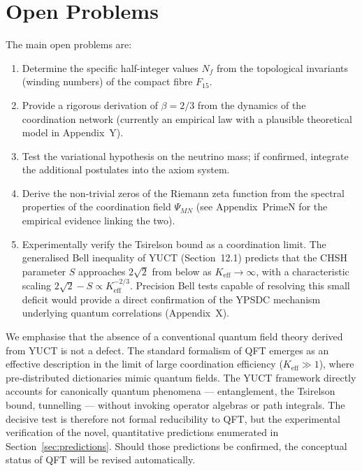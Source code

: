\documentclass[12pt,a4paper]{article}
\theoremstyle{remark}
\begin{document}
	\section{Open Problems}
	\label{sec:open}
	
	The main open problems are:
	
	\begin{enumerate}[label=(\roman*)]
		\item Determine the specific half-integer values \(N_f\) from the topological
		invariants (winding numbers) of the compact fibre \(F_{15}\).
		\item Provide a rigorous derivation of \(\beta = 2/3\) from the dynamics of
		the coordination network (currently an empirical law with a plausible
		theoretical model in Appendix~Y).
		\item Test the variational hypothesis on the neutrino mass; if confirmed,
		integrate the additional postulates into the axiom system.
		\item Derive the non-trivial zeros of the Riemann zeta function from the
		spectral properties of the coordination field \(\Psi_{MN}\) (see
		Appendix~PrimeN for the empirical evidence linking the two).
		\item Experimentally verify the Tsirelson bound as a coordination limit.
		The generalised Bell inequality of YUCT (Section~12.1) predicts that the
		CHSH parameter \(S\) approaches \(2\sqrt{2}\) from below as
		\(K_{\mathrm{eff}} \to \infty\), with a characteristic scaling
		\(2\sqrt{2} - S \propto K_{\mathrm{eff}}^{-2/3}\).  Precision Bell tests
		capable of resolving this small deficit would provide a direct confirmation
		of the YPSDC mechanism underlying quantum correlations (Appendix~X).
	\end{enumerate}
	
	We emphasise that the absence of a conventional quantum field theory
	derived from YUCT is not a defect.  The standard formalism of QFT
	emerges as an effective description in the limit of large coordination
	efficiency (\(K_{\mathrm{eff}} \gg 1\)), where pre‑distributed dictionaries
	mimic quantum fields.  The YUCT framework directly accounts for
	canonically quantum phenomena --- entanglement, the Tsirelson bound,
	tunnelling --- without invoking operator algebras or path integrals.
	The decisive test is therefore not formal reducibility to QFT, but
	the experimental verification of the novel, quantitative predictions
	enumerated in Section~\ref{sec:predictions}.  Should those predictions
	be confirmed, the conceptual status of QFT will be revised
	automatically.
	
\end{document}
